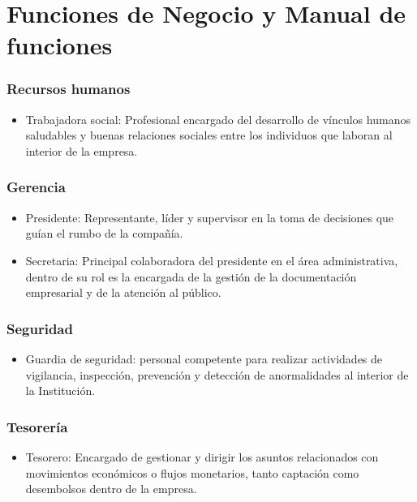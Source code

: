\section{Funciones de Negocio y Manual de funciones}

\subsubsection {Recursos humanos}
\begin{itemize}
	\item Trabajadora social: Profesional encargado del desarrollo de vínculos humanos saludables y buenas relaciones sociales entre los individuos que laboran al interior de la empresa.\\
\end{itemize}

\subsubsection {Gerencia}
\begin{itemize}
	\item Presidente: Representante, líder y supervisor en la toma de decisiones que guían el rumbo de la compañía. \\
	\item Secretaria: Principal colaboradora del presidente en el área administrativa, dentro de su rol es la encargada de la gestión de la documentación empresarial y de la atención al público.\\
\end{itemize}

\subsubsection{Seguridad} 
\begin{itemize}
	\item Guardia de seguridad: personal competente para realizar  actividades  de  vigilancia,  inspección,  prevención  y  detección  de  anormalidades  al interior de la Institución.
\end{itemize}

\subsubsection{Tesorería} 
\begin{itemize}
	\item Tesorero: Encargado de gestionar y dirigir los asuntos relacionados con movimientos económicos o flujos monetarios, tanto captación como desembolsos dentro de la empresa.
\end{itemize}

